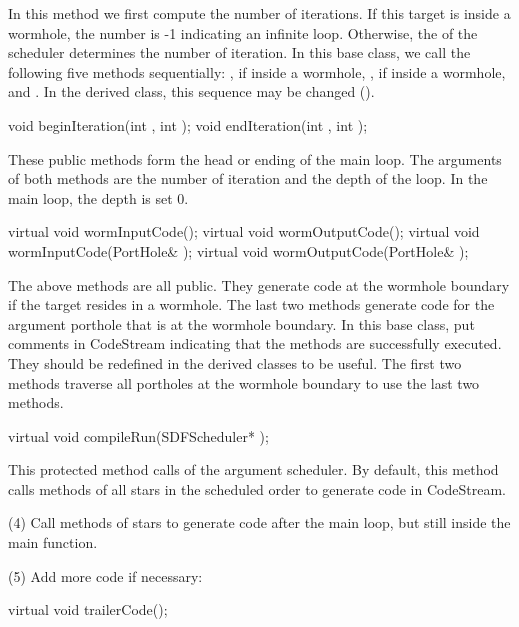 In this method we first compute the number of iterations. If this
target is inside a wormhole, the number is -1 indicating an infinite
loop. Otherwise, the  of the scheduler determines the number
of iteration.  In this base class, we call the following five methods
sequentially: ,  if inside a 
wormhole, ,  if inside a wormhole, and
. In the derived class, this sequence may be changed
().

\begin{example}
void beginIteration(int , int );
void endIteration(int , int );
\end{example}

These public methods form the head or ending of the main loop. The
arguments of both methods are the number of iteration and the depth of
the loop. In the main loop, the depth is set 0.

\begin{example}
virtual void wormInputCode();
virtual void wormOutputCode();
virtual void wormInputCode(PortHole& );
virtual void wormOutputCode(PortHole& );
\end{example}

The above methods are all public. They generate code at the wormhole
boundary if the target resides in a wormhole. The last two methods
generate code for the argument porthole that is at the wormhole
boundary. In this base class, put comments in  CodeStream
indicating that the methods are successfully executed. They should be
redefined in the derived classes to be useful. The first two methods
traverse all portholes at the wormhole boundary to use the last two
methods.

\begin{example}
virtual void compileRun(SDFScheduler* );
\end{example}

This protected method calls  of the argument scheduler. 
By default, this method calls  methods of all stars in the
scheduled order to generate code in  CodeStream.

(4) Call  methods of stars to generate code after the main
loop, but still inside the main function.

(5) Add more code if necessary: 

\begin{example}
virtual void trailerCode();
\end{example}

